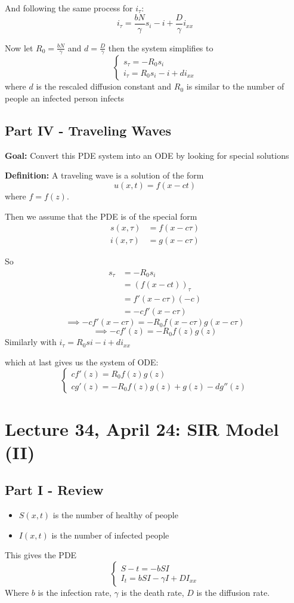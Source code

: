 \documentclass[12pt]{article}
\begin{document}
And following the same process for $i_\tau$:
\[i_\tau = \frac{bN}{\gamma}s_i - i + \frac{D}{\gamma}i_{xx}\]

Now let $R_0 = \frac{bN}{\gamma}$ and $d = \frac{D}{\gamma}$ then the system simplifies to 
\[\boxed{\begin{cases}
    s_\tau = -R_0 s_i\\
    i_\tau = R_0 s_i - i + di_{xx}
\end{cases}}\]
where $d$ is the rescaled diffusion constant and $R_0$ is similar to the number of people an infected person infects 

\subsection*{Part IV - Traveling Waves}
\textbf{Goal:} Convert this PDE system into an ODE by looking for special solutions

\textbf{Definition:} A traveling wave is a solution of the form 
\[u(x, t) = f(x - ct)\]
where $f = f(z)$. 

Then we assume that the PDE is of the special form 
\begin{align*}
    s(x, \tau) &=f(x - c\tau)\\
    i(x, \tau) &= g(x - c\tau)
\end{align*}

So 
\begin{align*}
    s_\tau &= -R_0 s_i\\
    &= (f(x - ct))_\tau\\
    &= f'(x-c\tau)(-c)\\
    &= -cf'(x- c\tau)
\end{align*}
\[\implies -cf'(x- c\tau) = -R_0 f(x - c\tau)g(x - c\tau)\]
\[\implies -cf'(z) = -R_0 f(z)g(z)\]
Similarly with $i_\tau = R_0 si - i + di_{xx}$

which at last gives us the system of ODE:
\[\boxed{\begin{cases}
    cf'(z) = R_0f(z)g(z)\\
    cg'(z) = -R_0 f(z)g(z) + g(z) - dg''(z)
\end{cases}}\]

\section*{Lecture 34, April 24: SIR Model (II)}
\subsection*{Part I - Review}
\begin{itemize}
    \item $S(x, t)$ is the number of healthy of people
    \item $I(x, t)$ is the number of infected people 
\end{itemize}
This gives the PDE 
\[\begin{cases}
    S-t = -bSI\\
    I_t = bSI - \gamma I + DI_{xx}
\end{cases}\]
Where $b$ is the infection rate, $\gamma$ is the death rate, $D$ is the diffusion rate.
\end{document}
